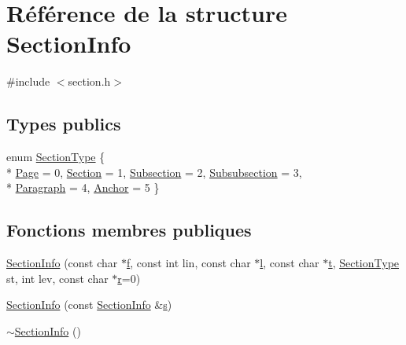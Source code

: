 \hypertarget{struct_section_info}{}\section{Référence de la structure Section\+Info}
\label{struct_section_info}


{\ttfamily \#include $<$section.\+h$>$}

\subsection*{Types publics}
\begin{DoxyCompactItemize}
\item 
enum \hyperlink{struct_section_info_a32308f52dd59422b14fb75a92c90ebf1}{Section\+Type} \{ \\*
\hyperlink{struct_section_info_a32308f52dd59422b14fb75a92c90ebf1ab7fe9ec79f1d04f6e6be2a58b9b47405}{Page} = 0, 
\hyperlink{struct_section_info_a32308f52dd59422b14fb75a92c90ebf1a15dc8071785cc7fe6101a290d5450e57}{Section} = 1, 
\hyperlink{struct_section_info_a32308f52dd59422b14fb75a92c90ebf1a68f0c1758676721ca67c36c1dc151816}{Subsection} = 2, 
\hyperlink{struct_section_info_a32308f52dd59422b14fb75a92c90ebf1acdfc66de4770347c39215c584c175c53}{Subsubsection} = 3, 
\\*
\hyperlink{struct_section_info_a32308f52dd59422b14fb75a92c90ebf1a85d1f347c175312d178170b0dd3ed35c}{Paragraph} = 4, 
\hyperlink{struct_section_info_a32308f52dd59422b14fb75a92c90ebf1a49cff4beb26b3e91717992c9228bd15b}{Anchor} = 5
 \}
\end{DoxyCompactItemize}
\subsection*{Fonctions membres publiques}
\begin{DoxyCompactItemize}
\item 
\hyperlink{struct_section_info_a32f7bf6d4f16717331867621b5753fe1}{Section\+Info} (const char $\ast$\hyperlink{060__command__switch_8tcl_af6830d2c644b45088ea8f1f74a46b778}{f}, const int lin, const char $\ast$\hyperlink{060__command__switch_8tcl_aff56f84b49947b84b2a304f51cf8e678}{l}, const char $\ast$\hyperlink{058__bracket__recursion_8tcl_a69e959f6901827e4d8271aeaa5fba0fc}{t}, \hyperlink{struct_section_info_a32308f52dd59422b14fb75a92c90ebf1}{Section\+Type} st, int lev, const char $\ast$\hyperlink{060__command__switch_8tcl_a0a0bd3dc69dd06934c4e6362155e0ace}{r}=0)
\item 
\hyperlink{struct_section_info_acd07dd13cd3d649a7a103e91d5c59cd9}{Section\+Info} (const \hyperlink{struct_section_info}{Section\+Info} \&\hyperlink{060__command__switch_8tcl_a011c73f2dbb87635a3b4206c72355f6e}{s})
\item 
\hyperlink{struct_section_info_affd6ea0ae5137a85cb23f82abff8dd9e}{$\sim$\+Section\+Info} ()
\end{DoxyCompactItemize}
